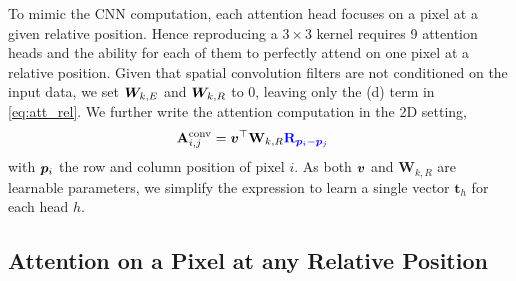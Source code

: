 \documentclass{article} %
\begin{document}
To mimic the CNN computation, each attention head focuses on a pixel at a given relative position.
Hence reproducing a $3\times 3$ kernel requires 9 attention heads and the ability for each of them to perfectly attend on
one pixel at a relative position.
Given that spatial convolution filters are not conditioned on the input data, we set ${\bm{W}}_{k, E}$ and ${\bm{W}}_{k, R}$ to 0, leaving only the (d) term in \eqref{eq:att_rel}.
We further write the attention computation in the 2D setting,
\begin{align}
  \mathbf{A}_{i, j}^{\mathrm{conv}} &= {\bm{v}}^{\top} \mathbf{W}_{k, R} {\color{blue} \mathbf{R}_{{\bm{p}}_i - {\bm{p}}_j}}
\end{align}
with ${\bm{p}}_i$ the row and column position of pixel $i$. As both ${\bm{v}}$ and $\mathbf{W}_{k, R}$ are learnable parameters, we simplify the expression to learn a single vector $\mathbf{t}_h$ for each head $h$.

\subsection{Attention on a Pixel at any Relative Position}
\end{document}
